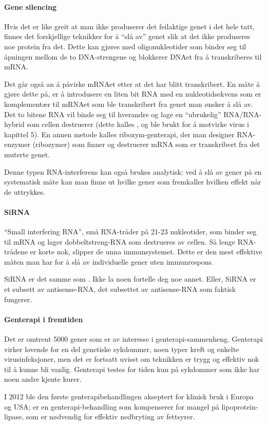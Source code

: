 \paragraph{Gene silencing} Hvis det er like greit at man ikke produserer det feilaktige genet i det hele tatt, finnes det forskjellige teknikker for å ``slå av'' genet slik at det ikke produseres noe protein fra det. Dette kan gjøres med oligonukleotider som binder seg til åpningen mellom de to DNA-strengene og blokkerer DNAet fra å transkriberes til mRNA. 

Det går også an å påvirke mRNAet etter at det har blitt transkribert. En måte å gjøre dette på, er å introdusere en liten bit RNA med en nukleotidsekvens som er komplementær til mRNAet som ble transkribert fra genet man ønsker å slå av. Det to bitene RNA vil binde seg til hverandre og lage en ``ubrukelig'' RNA/RNA-hybrid som cellen destruerer (dette kalles , og ble brukt for å motvirke virus i kapittel 5). En annen metode kalles ribozym-genterapi, der man designer RNA-enzymer (ribozymer) som finner og destruerer mRNA som er transkribert fra det muterte genet.

Denne typen RNA-interferens kan også brukes analytisk: ved å slå av gener på en systematisk måte kan man finne ut hvilke gener som fremkaller hvilken effekt når de uttrykkes.

\paragraph{SiRNA} ``Small interfering RNA'', små RNA-tråder på 21-23 nukleotider, som binder seg til mRNA og lager dobbeltstreng-RNA som destrueres av cellen. Så lenge RNA-trådene er korte nok, slipper de unna immunsystemet. Dette er den mest effektive måten man har for å slå av individuelle gener uten immunrespons.

SiRNA er det samme som . Ikke la noen fortelle deg noe annet. Eller, SiRNA er et subsett av antisense-RNA, det subsettet av antisense-RNA som faktisk fungerer.

\paragraph{Genterapi i fremtiden} Det er omtrent 5000 gener som er av interesse i genterapi-sammenheng. Genterapi virker lovende for en del genetiske sykdommer, noen typer kreft og enkelte virusinfeksjoner, men det er fortsatt uvisst om teknikken er trygg og effektiv nok til å kunne bli vanlig. Genterapi testes for tiden kun på sykdommer som ikke har noen andre kjente kurer.

I 2012 ble den første genterapibehandlingen akseptert for klinisk bruk i Europa og USA;  er en genterapi-behandling som kompenserer for mangel på lipoprotein-lipase, som er nødvendig for effektiv nedbryting av fettsyrer.
